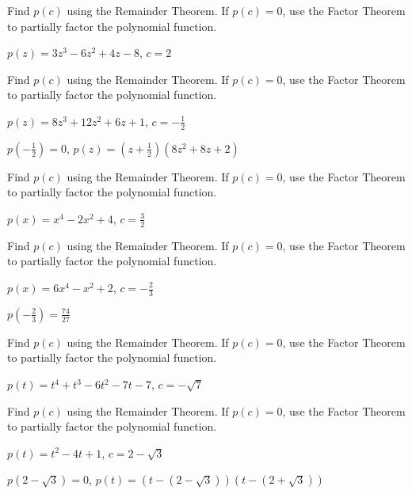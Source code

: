 \documentclass{ximera}
\begin{document}
\begin{problem}
Find $p(c)$ using the Remainder Theorem.  If $p(c) = 0$, use the Factor Theorem to partially factor the polynomial function.

$p(z) =3z^3-6z^2+4z-8$, $c=2$
\end{problem}

\begin{problem}
Find $p(c)$ using the Remainder Theorem.  If $p(c) = 0$, use the Factor Theorem to partially factor the polynomial function.

$p(z) = 8z^3+12z^2+6z+1$, $c =-\frac{1}{2}$

\begin{solution}
$p\left(-\frac{1}{2}\right) = 0$, $p(z)  = \left(z+\frac{1}{2}\right)\left(8z^2+8z+2\right)$   
\end{solution}
\end{problem}

\begin{problem}
Find $p(c)$ using the Remainder Theorem.  If $p(c) = 0$, use the Factor Theorem to partially factor the polynomial function.

$p(x) = x^4 - 2x^2+4$, $c=\frac{3}{2}$
\end{problem}

\begin{problem}
Find $p(c)$ using the Remainder Theorem.  If $p(c) = 0$, use the Factor Theorem to partially factor the polynomial function.

$p(x) = 6x^4-x^2+2$, $c =-\frac{2}{3}$

\begin{solution}
$p\left(-\frac{2}{3}\right) = \frac{74}{27}$
\end{solution}
\end{problem}

\begin{problem}
Find $p(c)$ using the Remainder Theorem.  If $p(c) = 0$, use the Factor Theorem to partially factor the polynomial function.

$p(t) = t^4 +t^3-6t^2-7t-7$, $c=-\sqrt{7}$
\end{problem}

\begin{problem}\label{remainderexerlast}
Find $p(c)$ using the Remainder Theorem.  If $p(c) = 0$, use the Factor Theorem to partially factor the polynomial function.

$p(t) = t^2-4t+1$, $c =2-\sqrt{3}$

\begin{solution}
$p(2-\sqrt{3}) =0$, $p(t) = (t-(2-\sqrt{3}))(t-(2+\sqrt{3})) $
\end{solution}
\end{problem}
\end{document}
